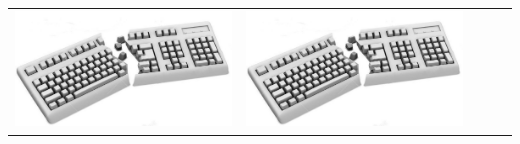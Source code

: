 \begin{frame}
\begin{description}[short]
\begin{tabular}{ccccc}
    \includegraphics[scale=0.025]{input/content/figures/borken_keyboard.pdf} &
    \includegraphics[scale=0.025]{input/content/figures/borken_keyboard.pdf}
  \end{tabular}


\end{description}
\end{frame}
